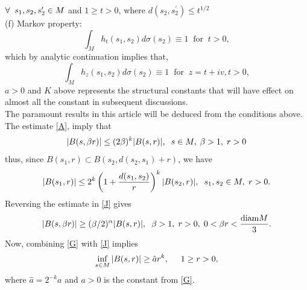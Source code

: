 \documentclass[10pt]{article}
\theoremstyle{definition}
\numberwithin{equation}{section}
\begin{document}
	$\forall \hspace{0.2 cm}s_1,s_2,s_2^{\prime} \in M$ and $1\geq t>0 $, where $ d(s_2,s_2^{\prime}) \leq t^{1/2}$\\
	(f) Markov property:
	\begin{equation}
		\int_{M} h_t (s_1,s_2) d \sigma (s_2) \equiv 1 \;\; \mbox{for} \;\; t>0,
	\end{equation}
	which by analytic continuation implies that,
	\begin{equation}\label{I}
		\int_{M} h_z (s_1,s_2) d \sigma (s_2) \equiv 1 \;\; \mbox{for} \;\; z = t + iv, t>0,
	\end{equation}
	 $a > 0$ and $K$ above represents the structural constants that will have effect on almost all the constant in subsequent discussions.\\
	The paramount results in this article will be deduced from the conditions above.\\
	The estimate \eqref{A}, imply that
	\begin{equation}\label{J}
		|B(s,\beta r)| \leq (2\beta)^k |B(s,r)|, \hspace{0.2 cm} s \in M, \hspace{0.1 cm} \beta >1, \hspace{0.1 cm} r>0
	\end{equation}
	thus, since $B(s_1,r) \subset B(s_2, d(s_2,s_1) + r)$, we have\\
	\begin{equation}\label{K}
		| B(s_1,r)| \leq 2^k \left( 1+ \frac{d(s_1,s_2)}{r} \right)^k | B(s_2,r)|, \hspace{0.2 cm} s_1,s_2 \in M, \hspace{0.1 cm} r>0.
	\end{equation}
	Reversing the estimate in \eqref{J} gives
	\begin{equation}
		|B(s, \beta r)| \geq (\beta /2)^{\alpha} |B(s,r)|, \hspace{0.2 cm} \beta >1, \hspace{0.1 cm} r>0, \hspace{0.1 cm} 0< \beta r < \frac{\mbox{diam} M}{3}.
	\end{equation}
	Now, combining \eqref{G} with \eqref{J} implies
	\begin{equation}\label{Y}
		\inf_{s\in M} |B(s,r)|\geq \hat{a}r^k, \hspace{0.5 cm} 1\geq r >0,
	\end{equation}
	where $ \hat{a}=2^{-k}a$ and $ a>0$ is the constant from \eqref{G}.\\
\end{document}
